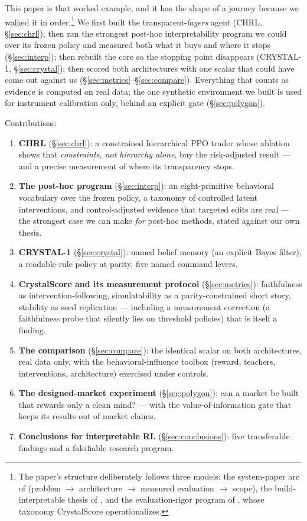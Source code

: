 \documentclass[11pt]{article}
\begin{document}
This paper is that worked example, and it has the shape of a journey because we walked it in
order.\footnote{The paper's structure deliberately follows three models: the system-paper arc of
\citet{mnih2015} (problem $\to$ architecture $\to$ measured evaluation $\to$ scope), the
build-interpretable thesis of \citet{rudin2019}, and the evaluation-rigor program of
\citet{doshivelez2017}, whose taxonomy CrystalScore operationalizes.} We first built the
transparent-\emph{layers} agent (CHRL, \S\ref{sec:chrl}); then ran the strongest post-hoc
interpretability program we could over its frozen policy and measured both what it buys and
where it stops (\S\ref{sec:interp}); then rebuilt the core so the stopping point disappears
(CRYSTAL-1, \S\ref{sec:crystal}); then scored both architectures with one scalar that could
have come out against us (\S\ref{sec:metrics}--\S\ref{sec:compare}). Everything that counts as
evidence is computed on real data; the one synthetic environment we built is used for instrument
calibration only, behind an explicit gate (\S\ref{sec:polygon}).

Contributions:
\begin{enumerate}
  \item \textbf{CHRL} (\S\ref{sec:chrl}): a constrained hierarchical PPO trader whose ablation
        shows that \emph{constraints, not hierarchy alone}, buy the risk-adjusted result ---
        and a precise measurement of where its transparency stops.
  \item \textbf{The post-hoc program} (\S\ref{sec:interp}): an eight-primitive behavioral
        vocabulary over the frozen policy, a taxonomy of controlled latent interventions, and
        control-adjusted evidence that targeted edits are real --- the strongest case we can
        make \emph{for} post-hoc methods, stated against our own thesis.
  \item \textbf{CRYSTAL-1} (\S\ref{sec:crystal}): named belief memory (an explicit Bayes
        filter), a readable-rule policy at parity, five named command levers.
  \item \textbf{CrystalScore and its measurement protocol} (\S\ref{sec:metrics}): faithfulness
        as intervention-following, simulatability as a parity-constrained short story,
        stability as seed replication --- including a measurement correction (a faithfulness
        probe that silently lies on threshold policies) that is itself a finding.
  \item \textbf{The comparison} (\S\ref{sec:compare}): the identical scalar on both
        architectures, real data only, with the behavioral-influence toolbox (reward, teachers,
        interventions, architecture) exercised under controls.
  \item \textbf{The designed-market experiment} (\S\ref{sec:polygon}): can a market be built
        that rewards only a clean mind? --- with the value-of-information gate that keeps its
        results out of market claims.
  \item \textbf{Conclusions for interpretable RL} (\S\ref{sec:conclusions}): five
        transferable findings and a falsifiable research program.
\end{enumerate}
\end{document}
